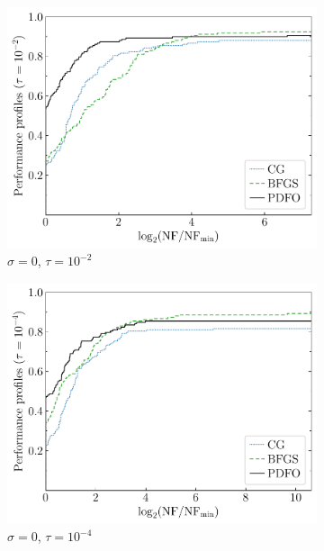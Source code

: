 \documentclass[
    smallextended,  %
    final,          %
]{svjour3}
\begin{document}
\begin{figure}[htbp]
    \begin{subfigure}{.48\textwidth}
        \centering
        \includegraphics[width=\textwidth]{perf-plain-bfgs_cg_pdfo-50-2.pdf}
        \caption{$\sigma = 0$, $\tau = 10^{-2}$}
    \end{subfigure}
    \hfill
    \begin{subfigure}{.48\textwidth}
        \centering
        \includegraphics[width=\textwidth]{perf-plain-bfgs_cg_pdfo-50-4.pdf}
        \caption{$\sigma = 0$, $\tau = 10^{-4}$}
    \end{subfigure}
    \hfill
    \begin{subfigure}{.48\textwidth}

\end{subfigure}
\end{figure}
\end{document}
